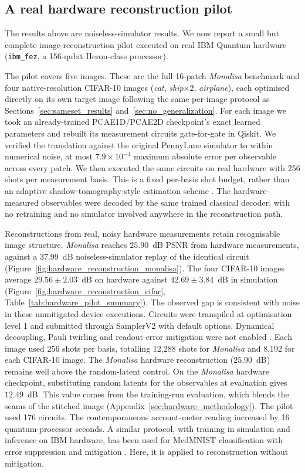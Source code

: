 \documentclass[pdflatex,sn-basic]{sn-jnl}
\begin{document}
\subsection{A real hardware reconstruction pilot}
\label{sec:hardware_pilot}

The results above are noiseless-simulator results.
We now report a small but complete image-reconstruction pilot executed on real IBM Quantum hardware (\texttt{ibm\_fez}, a 156-qubit Heron-class processor).

The pilot covers five images.
These are the full 16-patch \textit{Monalisa} benchmark and four native-resolution CIFAR-10 images (\textit{cat}, \textit{ship}$\times2$, \textit{airplane}), each optimised directly on its own target image following the same per-image protocol as Sections~\ref{sec:sameset_results} and~\ref{sec:no_generalization}.
For each image we took an already-trained PCAE1D/PCAE2D checkpoint's exact learned parameters and rebuilt its measurement circuits gate-for-gate in Qiskit.
We verified the translation against the original PennyLane simulator to within numerical noise, at most $7.9\times10^{-4}$ maximum absolute error per observable across every patch.
We then executed the same circuits on real hardware with 256 shots per measurement basis.
This is a fixed per-basis shot budget, rather than an adaptive shadow-tomography-style estimation scheme \citep{Huang2020Shadows}.
The hardware-measured observables were decoded by the same trained classical decoder, with no retraining and no simulator involved anywhere in the reconstruction path.

Reconstructions from real, noisy hardware measurements retain recognisable image structure.
\textit{Monalisa} reaches $25.90$~dB PSNR from hardware measurements, against a $37.99$~dB noiseless-simulator replay of the identical circuit (Figure~\ref{fig:hardware_reconstruction_monalisa}).
The four CIFAR-10 images average $29.56\pm2.03$~dB on hardware against $42.69\pm3.84$~dB in simulation (Figure~\ref{fig:hardware_reconstruction_cifar}, Table~\ref{tab:hardware_pilot_summary}).
The observed gap is consistent with noise in these unmitigated device executions.
Circuits were transpiled at optimisation level 1 and submitted through SamplerV2 with default options.
Dynamical decoupling, Pauli twirling and readout-error mitigation were not enabled \citep[see][]{Temme2017, vandenBerg2022, Kim2023}.
Each image used 256 shots per basis, totalling 12{,}288 shots for \textit{Monalisa} and 8{,}192 for each CIFAR-10 image.
The \textit{Monalisa} hardware reconstruction ($25.90$~dB) remains well above the random-latent control.
On the \textit{Monalisa} hardware checkpoint, substituting random latents for the observables at evaluation gives $12.49$~dB.
This value comes from the training-run evaluation, which blends the seams of the stitched image (Appendix~\ref{sec:hardware_methodology}).
The pilot used 176 circuits.
The contemporaneous account-meter reading increased by 16 quantum-processor seconds.
A similar protocol, with training in simulation and inference on IBM hardware, has been used for MedMNIST classification with error suppression and mitigation \citep{Singh2026}.
Here, it is applied to reconstruction without mitigation.
\end{document}

